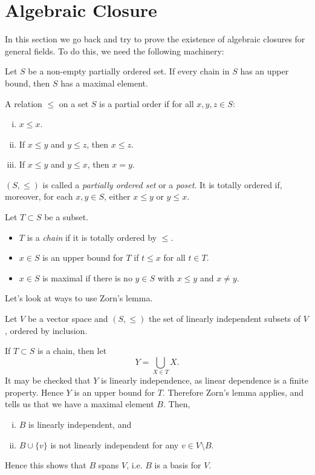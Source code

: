 \documentclass[12pt]{article}
\begin{document}

\newpage

\section{Algebraic Closure}
\label{sec:alg_clo}

In this section we go back and try to prove the existence of algebraic closures for general fields. To do this, we need the following machinery:

\begin{theorem}
	Let $S$ be a non-empty partially ordered set. If every chain in $S$ has an upper bound, then $S$ has a maximal element.
\end{theorem}

\begin{definition}
	A relation $\le$ on a set $S$ is a partial order if for all $x, y, z \in S$:
	\begin{enumerate}[(i)]
		\item $x \leq x$.
		\item If $x \leq y$ and $y \leq z$, then $x \leq z$.
		\item If $x \leq y$ and $y \leq x$, then $x = y$.
	\end{enumerate}
	$(S, \le)$ is called a \emph{partially ordered set} or a \emph{poset}. It is totally ordered if, moreover, for each $x, y \in S$, either $x \leq y$ or $y \leq x$.

	Let $T \subset S$ be a subset.
	\begin{itemize}
		\item $T$ is a \emph{chain} if it is totally ordered by $\leq$.
		\item $x \in S$ is an upper bound for $T$ if $t \leq x$ for all $t \in T$.
		\item $x \in S$ is maximal if there is no $y \in S$ with $x \leq y$ and $x \neq y$.
	\end{itemize}	
\end{definition}

Let's look at ways to use Zorn's lemma.

\begin{exbox}
	Let $V$ be a vector space and $(S, \leq)$ the set of linearly independent subsets of $V$, ordered by inclusion.

	If $T \subset S$ is a chain, then let
	\[
	Y = \bigcup_{X \in T} X.
	\]
	It may be checked that $Y$ is linearly independence, as linear dependence is a finite property. Hence $Y$ is an upper bound for $T$. Therefore Zorn's lemma applies, and tells us that we have a maximal element $B$. Then,
	\begin{enumerate}[(i)]
		\item $B$ is linearly independent, and
		\item $B \cup \{v\}$ is not linearly independent for any $v \in V \setminus B$.
	\end{enumerate}
	Hence this shows that $B$ spans $V$, i.e. $B$ is a basis for $V$.
\end{exbox}
\end{document}
